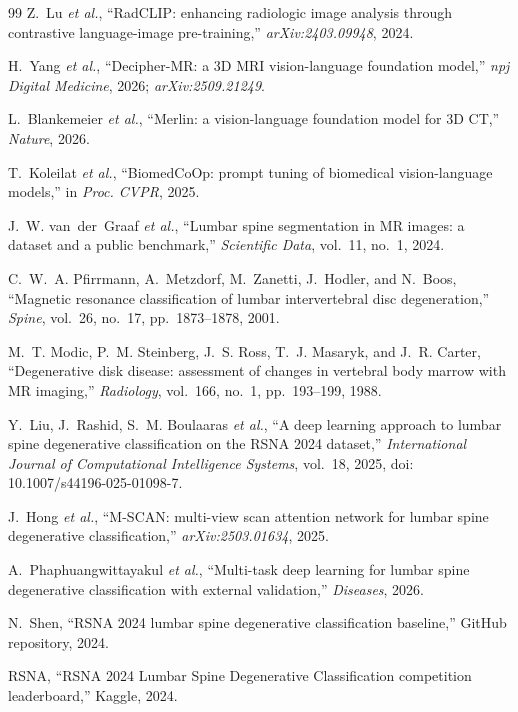 \documentclass[runningheads]{llncs}
\begin{document}
\begin{thebibliography}{99}
Z.~Lu \textit{et al.},
``RadCLIP: enhancing radiologic image analysis through contrastive
language-image pre-training,''
\textit{arXiv:2403.09948}, 2024.

H.~Yang \textit{et al.},
``Decipher-MR: a 3D MRI vision-language foundation model,''
\textit{npj Digital Medicine}, 2026;\newline
\textit{arXiv:2509.21249}.

L.~Blankemeier \textit{et al.},
``Merlin: a vision-language foundation model for 3D CT,''
\textit{Nature}, 2026.

T.~Koleilat \textit{et al.},
``BiomedCoOp: prompt tuning of biomedical vision-language models,''
in \textit{Proc. CVPR}, 2025.

J.~W. van~der~Graaf \textit{et al.},
``Lumbar spine segmentation in MR images: a dataset and a public
benchmark,''
\textit{Scientific Data}, vol.~11, no.~1, 2024.

C.~W.~A. Pfirrmann, A.~Metzdorf, M.~Zanetti, J.~Hodler, and
N.~Boos,
``Magnetic resonance classification of lumbar intervertebral disc
degeneration,''
\textit{Spine}, vol.~26, no.~17, pp.~1873--1878, 2001.

M.~T. Modic, P.~M. Steinberg, J.~S. Ross, T.~J. Masaryk, and
J.~R. Carter,
``Degenerative disk disease: assessment of changes in vertebral body
marrow with MR imaging,''
\textit{Radiology}, vol.~166, no.~1, pp.~193--199, 1988.

Y.~Liu, J.~Rashid, S.~M. Boulaaras \textit{et al.},
``A deep learning approach to lumbar spine degenerative classification
on the RSNA 2024 dataset,''
\textit{International Journal of Computational Intelligence Systems},
vol.~18, 2025, doi: 10.1007/s44196-025-01098-7.

J.~Hong \textit{et al.},
``M-SCAN: multi-view scan attention network for lumbar spine
degenerative classification,''
\textit{arXiv:2503.01634}, 2025.

A.~Phaphuangwittayakul \textit{et al.},
``Multi-task deep learning for lumbar spine degenerative
classification with external validation,''
\textit{Diseases}, 2026.

N.~Shen,
``RSNA 2024 lumbar spine degenerative classification baseline,''
GitHub repository, 2024.

RSNA, ``RSNA 2024 Lumbar Spine Degenerative Classification
competition leaderboard,''
Kaggle, 2024.

\end{thebibliography}
\end{document}
